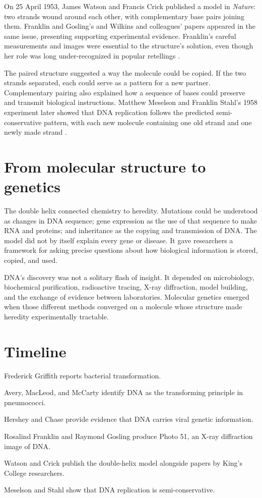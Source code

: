 \documentclass[12pt,oneside]{book}
\begin{document}
On 25 April 1953, James Watson and Francis Crick published a model in
\emph{Nature}: two strands wound around each other, with complementary
base pairs joining them. Franklin and Gosling's and Wilkins and colleagues'
papers appeared in the same issue, presenting supporting experimental
evidence. Franklin's careful measurements and images were essential to the
structure's solution, even though her role was long under-recognized in
popular retellings \cite{watsonCrick1953,kingsDNAHistory}.

The paired structure suggested a way the molecule could be copied. If the
two strands separated, each could serve as a pattern for a new partner.
Complementary pairing also explained how a sequence of bases could preserve
and transmit biological instructions. Matthew Meselson and Franklin Stahl's
1958 experiment later showed that DNA replication follows the predicted
semi-conservative pattern, with each new molecule containing one old strand
and one newly made strand \cite{watsonCrick1953,meselsonStahl1958}.

\section{From molecular structure to genetics}
The double helix connected chemistry to heredity. Mutations could be
understood as changes in DNA sequence; gene expression as the use of that
sequence to make RNA and proteins; and inheritance as the copying and
transmission of DNA. The model did not by itself explain every gene or
disease. It gave researchers a framework for asking precise questions about
how biological information is stored, copied, and used.

DNA's discovery was not a solitary flash of insight. It depended on
microbiology, biochemical purification, radioactive tracing, X-ray
diffraction, model building, and the exchange of evidence between
laboratories. Molecular genetics emerged when those different methods
converged on a molecule whose structure made heredity experimentally
tractable.

\section*{Timeline}
\begin{description}[leftmargin=2.3cm,style=nextline]
  \item[1928] Frederick Griffith reports bacterial transformation.
  \item[1944] Avery, MacLeod, and McCarty identify DNA as the transforming principle in pneumococci.
  \item[1952] Hershey and Chase provide evidence that DNA carries viral genetic information.
  \item[1952] Rosalind Franklin and Raymond Gosling produce Photo 51, an X-ray diffraction image of DNA.
  \item[25 April 1953] Watson and Crick publish the double-helix model alongside papers by King's College researchers.
  \item[1958] Meselson and Stahl show that DNA replication is semi-conservative.
\end{description}
\end{document}
